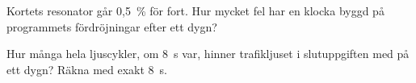 \label{c11:ex:11}
\begin{parts}
  \item Kortets resonator går 0,5~\% för fort. Hur mycket fel har en klocka byggd på programmets
    fördröjningar efter ett dygn?
  \item Hur många hela ljuscykler, om 8~s var, hinner trafikljuset i slutuppgiften med på ett
    dygn? Räkna med exakt 8~s.
\end{parts}
